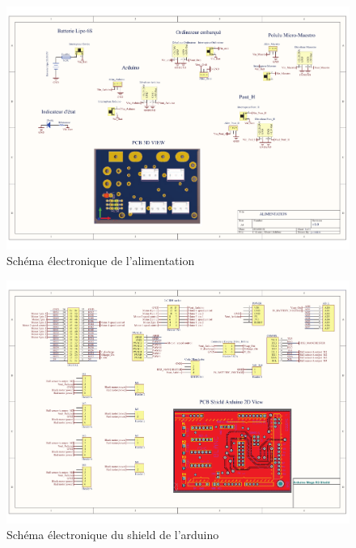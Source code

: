 \begin{landscape}
  \begin{figure}[ht]
    \centering
    \includegraphics[scale=0.6]{resources/alim.pdf}
    \caption{Schéma électronique de l'alimentation}
    \label{fig:alim}
  \end{figure}

  \begin{figure}[ht]
    \centering
    \includegraphics[scale=0.6]{resources/shield.pdf}
    \caption{Schéma électronique du shield de l'arduino}
    \label{fig:shield}
  \end{figure}
\end{landscape}
